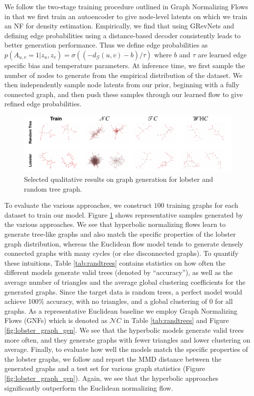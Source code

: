 We follow the two-stage training procedure outlined in Graph Normalizing Flows \cite{liu2019graph} in that we first train an autoencoder to give node-level latents on which we train an NF for density estimation. Empirically, we find that using GRevNets \cite{liu2019graph} and defining edge probabilities using a distance-based decoder consistently leads to better generation performance. Thus we define edge probabilities as $p(A_{u,v}=1|z_u,z_v) = \sigma((-d_{\mathcal{G}}(u,v) - b)/\tau)$ where $b$ and $\tau$ are learned edge specific bias and temperature parameters. At inference time, we first sample the number of nodes to generate from the empirical distribution of the dataset. We then independently sample node latents from our prior, beginning with a fully connected graph, and then push these samples through our learned flow to give refined edge probabilities. 

\begin{figure}
    \centering
    \includegraphics[width=\textwidth]{hyperbolic_graph_gen.pdf}
    \vspace{-5mm}
    \caption{Selected qualitative results on graph generation for lobster and random tree graph.}
    \label{fig:graph_generation_pic}
\end{figure}

To evaluate the various approaches, we construct $100$ training graphs for each dataset to train our model.
Figure \ref{fig:graph_generation_pic} shows representative samples generated by the various approaches.
We see that hyperbolic normalizing flows learn to generate tree-like graphs and also match the specific properties of the lobster graph distribution, whereas the Euclidean flow model tends to generate densely connected graphs with many cycles (or else disconnected graphs). 
To quantify these intuitions, Table \ref{tab:randtrees} contains statistics on how often the different models generate valid trees (denoted by ``accuracy''), as well as the average number of triangles and the average global clustering coefficients for the generated graphs. 
Since the target data is random trees, a perfect model would achieve 100\% accuracy, with no triangles, and a global clustering of 0 for all graphs. As a representative Euclidean baseline we employ Graph Normalizing Flows (GNFs) which is denoted as $\mathcal{N}C$ in Table \ref{tab:randtrees} and Figure \ref{fig:lobster_graph_gen}.
We see that the hyperbolic models generate valid trees more often, and they generate graphs with fewer triangles and lower clustering on average.
Finally, to evaluate how well the models match the specific properties of the lobster graphs, we follow \citet{liao2019efficient} and report the MMD distance between the generated graphs and a test set for various graph statistics (Figure \ref{fig:lobster_graph_gen}).
Again, we see that the hyperbolic approaches significantly outperform the Euclidean normalizing flow. 

